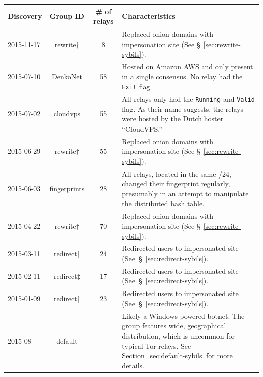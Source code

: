 \begin{table}[t]
\centering
\begin{tabular}{l c c p{10cm}}
\textbf{Discovery} & \textbf{Group ID} & \textbf{\# of relays} & \textbf{Characteristics} \\
\hline
2015-11-17 & rewrite$\dagger$ & 8 & Replaced onion domains with impersonation site (See \S~\ref{sec:rewrite-sybils}). \\

2015-07-10 & DenkoNet & 58 & Hosted on Amazon AWS and only present in a single
consensus.  No relay had the \texttt{Exit} flag. \\

2015-07-02 & cloudvps & 55 & All relays only had the \texttt{Running} and
\texttt{Valid} flag.  As their name suggests, the relays were hosted by
the Dutch hoster ``CloudVPS.'' \\

2015-06-29 & rewrite$\dagger$ & 55 & Replaced onion domains with impersonation site (See \S~\ref{sec:rewrite-sybils}). \\


2015-06-03 & fingerprints & 28 & All relays, located in the same /24, changed
their fingerprint regularly, presumably in an attempt to manipulate the
distributed hash table. \\

2015-04-22 & rewrite$\dagger$ & 70 & Replaced onion domains with impersonation site (See \S~\ref{sec:rewrite-sybils}). \\

2015-03-11 & redirect$\ddagger$ & 24 & Redirected users to impersonated site (See~\S~\ref{sec:redirect-sybils}). \\
2015-02-11 & redirect$\ddagger$ & 17 & Redirected users to impersonated site (See~\S~\ref{sec:redirect-sybils}). \\
2015-01-09 & redirect$\ddagger$ & 23 & Redirected users to impersonated site (See~\S~\ref{sec:redirect-sybils}). \\

2015-08 & default & --- & Likely a Windows-powered botnet.  The group
features wide, geographical distribution, which is uncommon for typical Tor
relays. See Section~\ref{sec:default-sybils} for more details. \\


\end{tabular}
\end{table}
